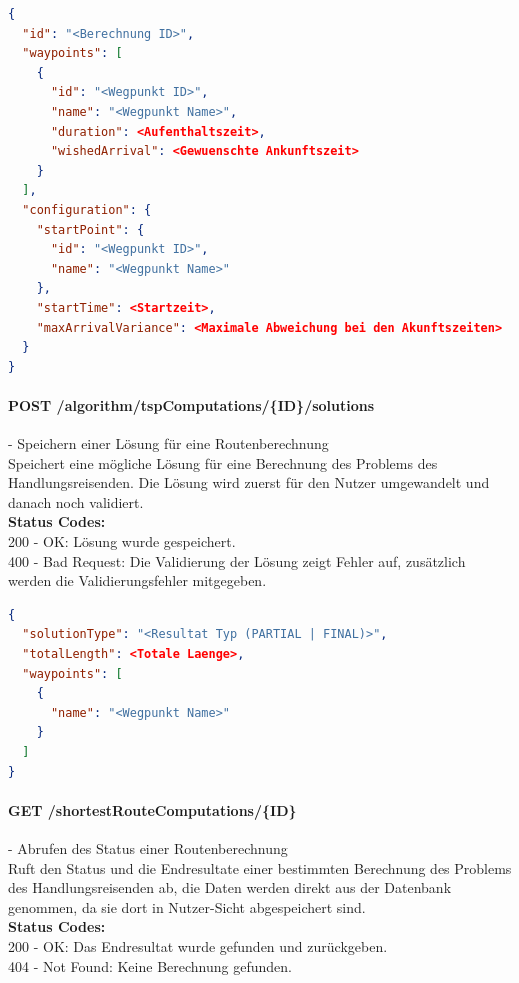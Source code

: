 \begin{lstlisting}[language=JSON, caption=Beispiel für Eingabedaten des Problem des Handlungsreisenden für den Algorithmus, label=lst:input_tsp_algo]  
{
  "id": "<Berechnung ID>",
  "waypoints": [
    {
      "id": "<Wegpunkt ID>",
      "name": "<Wegpunkt Name>",
      "duration": <Aufenthaltszeit>,
      "wishedArrival": <Gewuenschte Ankunftszeit>
    }
  ],
  "configuration": {
    "startPoint": {
      "id": "<Wegpunkt ID>",
      "name": "<Wegpunkt Name>"
    },
    "startTime": <Startzeit>,
    "maxArrivalVariance": <Maximale Abweichung bei den Akunftszeiten>
  }
}
\end{lstlisting}

\paragraph{POST /algorithm/tspComputations/\{ID\}/solutions} - Speichern einer Lösung für eine Routenberechnung \mbox{}\\
Speichert eine mögliche Lösung für eine Berechnung des Problems des Handlungsreisenden. Die Lösung wird zuerst für den Nutzer umgewandelt und danach noch validiert.\\
\textbf{Status Codes:}\\
200 - OK: Lösung wurde gespeichert.\\
400 - Bad Request: Die Validierung der Lösung zeigt Fehler auf, zusätzlich werden die Validierungsfehler mitgegeben.\\

\begin{lstlisting}[language=JSON, caption=Beispiel eines Resultates für das Problem des Handlungsreisenden aus Algorithmus-Sicht, label=lst:solution_tsp_algo]  
{
  "solutionType": "<Resultat Typ (PARTIAL | FINAL)>",
  "totalLength": <Totale Laenge>,
  "waypoints": [
    {
      "name": "<Wegpunkt Name>"
    }
  ]
}
\end{lstlisting}

\paragraph{GET /shortestRouteComputations/\{ID\}} - Abrufen des Status einer Routenberechnung\mbox{}\\
Ruft den Status und die Endresultate einer bestimmten Berechnung des Problems des Handlungsreisenden ab, die Daten werden direkt aus der Datenbank genommen, da sie dort in Nutzer-Sicht abgespeichert sind.\\
\textbf{Status Codes:}\\
200 - OK: Das Endresultat wurde gefunden und zurückgeben.\\
404 - Not Found: Keine Berechnung gefunden.\\

